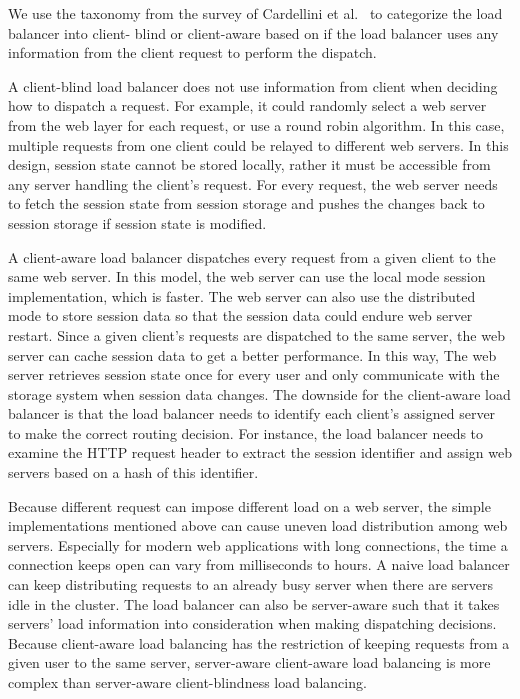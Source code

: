 We use the taxonomy from the survey of Cardellini et
al.~\cite{cardellini2002state} to categorize the load balancer into client-
blind or client-aware based on if the load balancer uses any information from
the client request to perform the dispatch.

A client-blind load balancer does not use information from client when
deciding how to dispatch a request. For example, it could randomly select a
web server from the web layer for each request, or use a round robin
algorithm. In this case, multiple requests from one client could be relayed to
different web servers. In this design, session state cannot be stored locally,
rather it must be accessible  from any server handling the client's request.
For every request, the web server needs to fetch the session state from
session storage and pushes the changes back to session storage if session
state is modified.


A client-aware load balancer dispatches every request from a given client to
the same web server. In this model, the web server can use the local mode
session implementation, which is faster. The web server can also use the
distributed mode to store session data so that the session data could endure
web server restart. Since a given client's requests are dispatched to the same
server, the web server can cache session data to get a better performance.  In
this way,   The web server retrieves session state once for every user and
only communicate with the storage system when session data changes. The
downside for the client-aware load balancer  is that the load balancer needs
to identify each client's assigned server to make the correct routing
decision. For instance, the load balancer needs to examine the HTTP request
header to extract the session identifier and assign web servers based on a
hash of this identifier.

Because different request can impose different load on a web server, the
simple implementations mentioned above can cause uneven load distribution
among web servers. Especially for modern web applications with long
connections, the time a connection keeps open can vary from milliseconds to
hours. A naive load balancer can keep distributing requests to an already busy
server when there are servers idle in the cluster. The load balancer can also
be server-aware such that  it  takes servers' load information into
consideration when making dispatching decisions. Because client-aware load
balancing has the restriction of keeping requests from a given user to the
same server, server-aware client-aware load balancing is more complex than
server-aware client-blindness load balancing.
 
